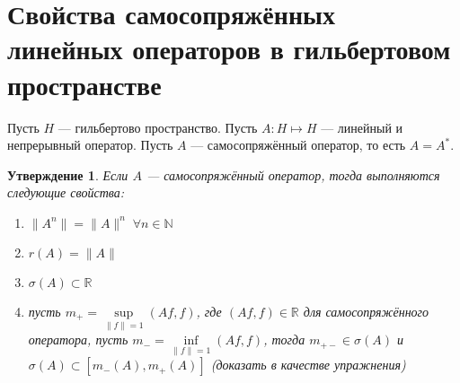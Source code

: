 \documentclass[12pt]{article}
\begin{document}
\newtheorem{Theor}{Теорема}
\newtheorem{Utv}{Утверждение}
\newtheorem{Opr}{Определение}
\newtheorem{Upr}{Упражнение}
\newtheorem{Nabl}{Наблюдение}
\newtheorem{Zam}{Замечание}
\section*{Свойства самосопряжённых линейных операторов в гильбертовом 
пространстве}
Пусть $H$ --- гильбертово пространство.
Пусть $A : H \mapsto H$ --- линейный и непрерывный оператор.
Пусть $A$ --- самосопряжённый оператор, то есть $A = A^*$.
\begin{Utv}
    Если $A$ --- самосопряжённый оператор, тогда выполняются следующие
    свойства:
    \begin{enumerate}
        \item{$\|A^n\| = \|A\|^n\; \forall n \in \mathbb N$}
        \item{$r(A) = \|A\|$}
        \item{$\sigma(A) \subset \mathbb R$}
        \item{пусть $m_+ = \sup \limits_{\|f\| = 1} (Af, f)$, где $(Af, f) \in 
                \mathbb R$ для самосопряжённого оператора, пусть $m_- = \inf 
                \limits_{\|f\| = 1} (Af, f)$, тогда $m_{+-} \in \sigma(A)$ и
                $\sigma(A) \subset [m_-(A), m_+(A)]$ (доказать в качестве
            упражнения)}
    \end{enumerate}
\end{Utv}
\end{document}
